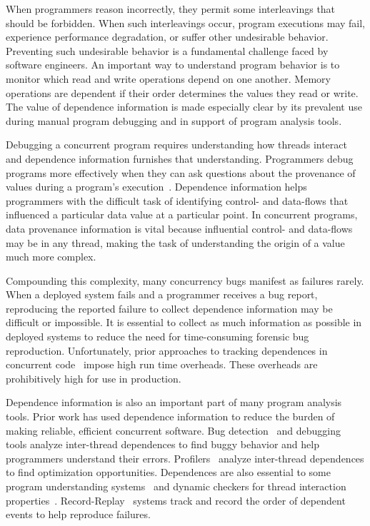 \documentclass[preprint,9pt]{sigplanconf}
\begin{document}
When programmers reason incorrectly, they permit some interleavings that should
be forbidden.  When such interleavings occur, program executions may fail,
experience performance degradation, or suffer other undesirable behavior.
Preventing such undesirable behavior is a fundamental challenge faced by
software engineers.  An important way to understand program behavior is to
monitor which read and write operations depend on one another.  Memory
operations are dependent if their order determines the values they read or
write.  The value of dependence information is made especially clear by its
prevalent use during manual program debugging and in support of program
analysis tools.

Debugging a concurrent program requires understanding how threads interact and
dependence information furnishes that understanding.  Programmers debug
programs more effectively when they can ask questions about the provenance of
values during a program's execution~\cite{slicingsurvey,whylineicse}.
Dependence information helps programmers with the difficult task of identifying
control- and data-flows that influenced a particular data value at a particular
point.  In concurrent programs, data provenance information is vital because
influential control- and data-flows may be in any thread, making the task of
understanding the origin of a value much more complex.

Compounding this complexity, many concurrency bugs manifest as failures rarely.
When a deployed system fails and a programmer receives a bug report,
reproducing the reported failure to collect dependence information may be
difficult or impossible.  It is essential to collect as much information as
possible in deployed systems to reduce the need for time-consuming forensic bug
reproduction.  Unfortunately, prior approaches to tracking dependences in
concurrent code~\cite{raceslicing,tipslicingsurvey} impose high run time
overheads.  These overheads are prohibitively high for use in production. 




Dependence information is also an important part of many program analysis
tools.  Prior work has used dependence information to reduce the burden of
making reliable, efficient concurrent software.  Bug
detection~\cite{avio,fasttrack,raceslicing,dmtracker} and
debugging~\cite{tipslicingsurvey,bugaboo,recon,cci,defuse,conseq,falcon} tools
analyze inter-thread dependences to find buggy behavior and help programmers
understand their errors.
Profilers~\cite{threadclustering,schedpredictionmodel} analyze inter-thread
dependences to find optimization opportunities.  Dependences are also essential
to some program understanding systems~\cite{oshatr} and dynamic checkers for
thread interaction properties~\cite{oshajava,velodrome}.
Record-Replay~\cite{chimera,doubleplay,fdr,rtr} systems track and record the
order of dependent events to help reproduce failures.  
\end{document}
